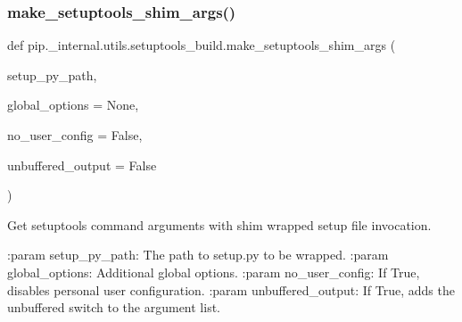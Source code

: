 \subsubsection{\texorpdfstring{make\+\_\+setuptools\+\_\+shim\+\_\+args()}{make\_setuptools\_shim\_args()}}
{\footnotesize\ttfamily def pip.\+\_\+internal.\+utils.\+setuptools\+\_\+build.\+make\+\_\+setuptools\+\_\+shim\+\_\+args (\begin{DoxyParamCaption}\item[{}]{setup\+\_\+py\+\_\+path,  }\item[{}]{global\+\_\+options = {\ttfamily None},  }\item[{}]{no\+\_\+user\+\_\+config = {\ttfamily False},  }\item[{}]{unbuffered\+\_\+output = {\ttfamily False} }\end{DoxyParamCaption})}

\begin{DoxyVerb}Get setuptools command arguments with shim wrapped setup file invocation.

:param setup_py_path: The path to setup.py to be wrapped.
:param global_options: Additional global options.
:param no_user_config: If True, disables personal user configuration.
:param unbuffered_output: If True, adds the unbuffered switch to the
 argument list.
\end{DoxyVerb}
 